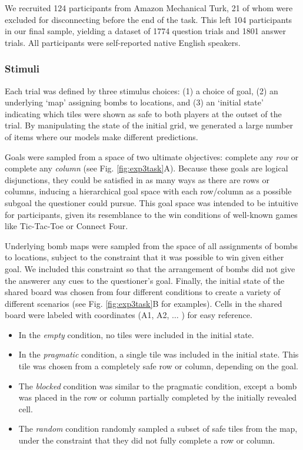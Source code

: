 \documentclass[11pt, floatsintext]{apa6}
\begin{document}
We recruited 124 participants from Amazon Mechanical Turk, 21 of whom were excluded for disconnecting before the end of the task. 
This left 104 participants in our final sample, yielding a dataset of 1774 question trials and 1801 answer trials. 
All participants were self-reported native English speakers.

\subsubsection{Stimuli}

Each trial was defined by three stimulus choices: (1) a choice of goal, (2) an underlying `map' assigning bombs to locations, and (3) an `initial state' indicating which tiles were shown as safe to both players at the outset of the trial.
By manipulating the state of the initial grid, we generated a large number of items where our models make different predictions. 

Goals were sampled from a space of two ultimate objectives: complete any \emph{row} or complete any \emph{column} (see Fig. \ref{fig:exp3task}A).
Because these goals are logical disjunctions, they could be satisfied in as many ways as there are rows or columns, inducing a hierarchical goal space with each row/column as a possible subgoal the questioner could pursue.
This goal space was intended to be intuitive for participants, given its resemblance to the win conditions of well-known games like Tic-Tac-Toe or Connect Four.

Underlying bomb maps were sampled from the space of all assignments of bombs to locations,  subject to the constraint that it was possible to win given either goal. 
We included this constraint so that the arrangement of bombs did not give the answerer any cues to the questioner's goal.
Finally, the initial state of the shared board was chosen from four different conditions to create a variety of different scenarios (see Fig. \ref{fig:exp3task}B for examples).
Cells in the shared board were labeled with coordinates (A1, A2, $\dots$ ) for easy reference.
\begin{itemize}
\item In the \emph{empty} condition, no tiles were included in the initial state.
\item In the \emph{pragmatic} condition, a single tile was included in the initial state. This tile was chosen from a completely safe row or column, depending on the goal.%
\item The \emph{blocked} condition was similar to the pragmatic condition, except a bomb was placed in the row or column partially completed by the initially revealed cell. %
\item The \emph{random} condition randomly sampled a subset of safe tiles from the map, under the constraint that they did not fully complete a row or column. 
\end{itemize}
\end{document}
